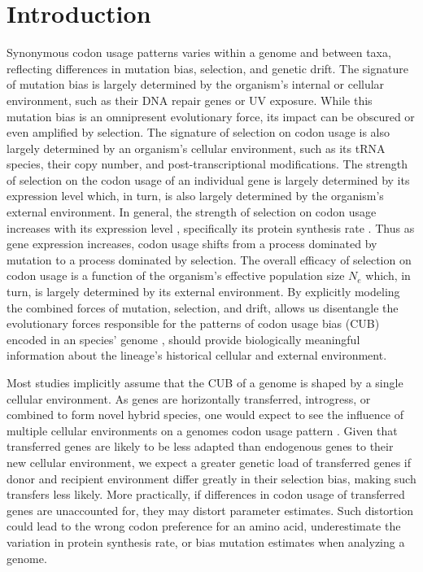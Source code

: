 \newpage


\section{Introduction}
Synonymous codon usage patterns varies within a genome and between taxa, reflecting differences in mutation bias, selection, and genetic drift.
The signature of mutation bias is largely determined by the organism's internal or cellular environment, such as their DNA repair genes or UV exposure.
While this mutation bias is an omnipresent evolutionary force, its impact can be obscured or even amplified by selection. 
The signature of selection on codon usage is also largely determined by an organism's cellular environment, such as its tRNA species, their copy number, and post-transcriptional modifications.
The strength of selection on the codon usage of an individual gene is largely determined by its expression level which, in turn, is also largely determined by the organism's external environment.
In general, the strength of selection on codon usage increases with its expression level \citep{gouy1982, ikemura1985, bulmer1990}, specifically its protein synthesis rate \citep{gilchrist2007}.
Thus as gene expression increases, codon usage shifts from a process dominated by mutation to a process dominated by selection.
The overall efficacy of selection on codon usage is a function of the organism's effective population size $N_e$ which, in turn, is largely determined by its external environment.
By explicitly modeling the combined forces of mutation, selection, and drift, \ROC allows us disentangle the evolutionary forces responsible for the patterns of codon usage bias (CUB) encoded in an species' genome \citep{gilchrist2007, ShahAndGilchrist2011, wallace2013, gilchrist2015}, should provide biologically meaningful information about the lineage's historical cellular and external environment.

Most studies implicitly assume that the CUB of a genome is shaped by a single cellular environment. 
As genes are horizontally transferred, introgress, or combined to form novel hybrid species, one would expect to see the influence of multiple cellular environments on a genomes codon usage pattern \citep{medigue1991,lawrence1997}.
Given that transferred genes are likely to be less adapted than endogenous genes to their new cellular environment, we expect a greater genetic load of transferred genes if donor and recipient environment differ greatly in their selection bias, making such transfers less likely.
More practically, if differences in codon usage of transferred genes are unaccounted for, they may distort parameter estimates.
Such distortion could lead to the wrong codon preference for an amino acid, underestimate the variation in protein synthesis rate, or bias mutation estimates when analyzing a genome.


